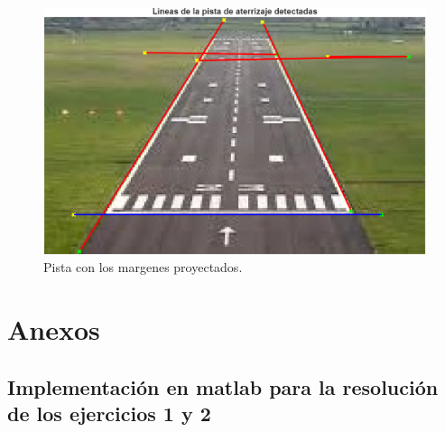 \documentclass[11pt, letterpaper]{article}
\begin{document}
\begin{figure}[h!]
	\centering
	\begin{minipage}{0.7\textwidth}
		\centering
		\includegraphics[width=\textwidth]{IMG/R5.png}
		\caption*{Pista con los margenes proyectados.}
	\end{minipage}\hfill
\end{figure}







\newpage
	
\section{Anexos}	

\subsection{Implementación en matlab para la resolución de los ejercicios 1 y 2}
\end{document}
